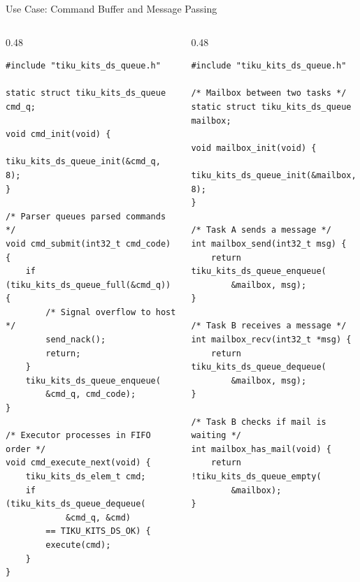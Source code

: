 \documentclass[aspectratio=169, 10pt]{beamer}
\begin{document}
\begin{frame}[fragile]{Use Case: Command Buffer and Message Passing}
\begin{columns}[T]
\begin{column}{0.48\textwidth}
\begin{lstlisting}[style=cstyle,
  title={Command buffer for serial protocol}]
#include "tiku_kits_ds_queue.h"

static struct tiku_kits_ds_queue cmd_q;

void cmd_init(void) {
    tiku_kits_ds_queue_init(&cmd_q, 8);
}

/* Parser queues parsed commands */
void cmd_submit(int32_t cmd_code) {
    if (tiku_kits_ds_queue_full(&cmd_q)) {
        /* Signal overflow to host */
        send_nack();
        return;
    }
    tiku_kits_ds_queue_enqueue(
        &cmd_q, cmd_code);
}

/* Executor processes in FIFO order */
void cmd_execute_next(void) {
    tiku_kits_ds_elem_t cmd;
    if (tiku_kits_ds_queue_dequeue(
            &cmd_q, &cmd)
        == TIKU_KITS_DS_OK) {
        execute(cmd);
    }
}
\end{lstlisting}
\end{column}

\begin{column}{0.48\textwidth}
\begin{lstlisting}[style=cstyle,
  title={Inter-task message passing}]
#include "tiku_kits_ds_queue.h"

/* Mailbox between two tasks */
static struct tiku_kits_ds_queue mailbox;

void mailbox_init(void) {
    tiku_kits_ds_queue_init(&mailbox, 8);
}

/* Task A sends a message */
int mailbox_send(int32_t msg) {
    return tiku_kits_ds_queue_enqueue(
        &mailbox, msg);
}

/* Task B receives a message */
int mailbox_recv(int32_t *msg) {
    return tiku_kits_ds_queue_dequeue(
        &mailbox, msg);
}

/* Task B checks if mail is waiting */
int mailbox_has_mail(void) {
    return !tiku_kits_ds_queue_empty(
        &mailbox);
}
\end{lstlisting}
\end{column}
\end{columns}
\end{frame}

\end{document}
